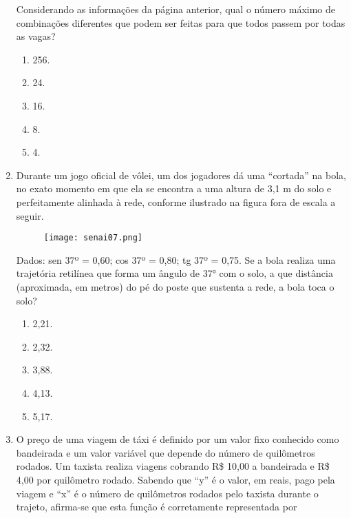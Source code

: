 \documentclass[a4paper,14pt]{article}
\begin{document}
\begin{enumerate}
	    Considerando as informações da página anterior, qual o número máximo de combinações diferentes que podem ser feitas para que todos passem por todas as vagas?
	    \begin{enumerate}
        	\item 256.
        	\item 24.
        	\item 16.
        	\item 8.
        	\item 4.
        \end{enumerate}
        
        \item Durante um jogo oficial de vôlei, um dos jogadores dá uma “cortada” na bola, no exato momento em que
        ela se encontra a uma altura de 3,1 m do solo e perfeitamente alinhada à rede, conforme ilustrado na
        figura fora de escala a seguir.
        \newline
        \newline 
        \begin{figure}[h] %
        	\centering
        	\texttt{[image: senai07.png]} %
        \end{figure}
        Dados: sen 37º = 0,60; cos 37º = 0,80; tg 37º = 0,75.
        \newline
        \newline
        Se a bola realiza uma trajetória retilínea que forma um ângulo de 37° com o solo, a que distância
        (aproximada, em metros) do pé do poste que sustenta a rede, a bola toca o solo?
        \begin{enumerate}
        	\item 2,21.
        	\item 2,32.
        	\item 3,88.
        	\item 4,13.
        	\item 5,17.
        \end{enumerate}
        \item O preço de uma viagem de táxi é definido por um valor fixo conhecido como bandeirada e um valor
        variável que depende do número de quilômetros rodados. Um taxista realiza viagens cobrando
        R\$ 10,00 a bandeirada e R\$ 4,00 por quilômetro rodado.
        Sabendo que “y” é o valor, em reais, pago pela viagem e “x” é o número de quilômetros rodados pelo
        taxista durante o trajeto, afirma-se que esta função é corretamente representada por
        

\end{enumerate}
\end{document}
